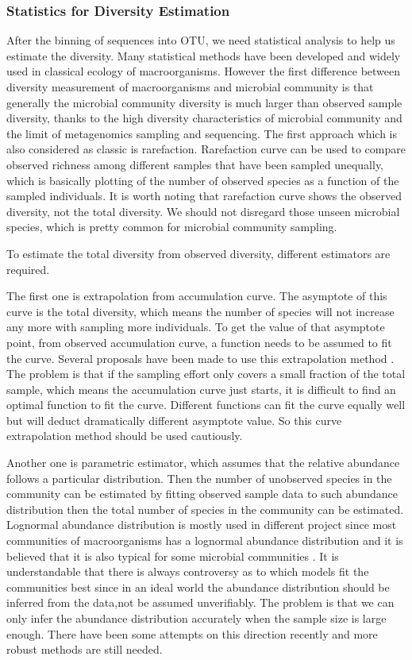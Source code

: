 \subsubsection{Statistics for Diversity Estimation} After the binning of
sequences into OTU, we need statistical analysis to help us estimate the diversity. Many
statistical methods have been developed and widely used in classical ecology of
macroorganisms. However the first difference between diversity measurement of
macroorganisms and microbial community is that generally the microbial
community diversity is much larger than observed sample diversity, thanks to
the high diversity characteristics of microbial community and the limit of
metagenomics sampling and sequencing. The first approach which is also
considered as classic is rarefaction. Rarefaction curve can be used to compare
observed richness among different samples that have been sampled unequally,
which is basically plotting of the number of observed species as a function of
the sampled individuals. It is worth noting that rarefaction curve shows the
observed diversity, not the total diversity. We should not disregard those
unseen microbial species, which is pretty common for microbial community
sampling.

To estimate the total diversity from observed diversity, different estimators
are required.

The first one is extrapolation from accumulation curve. The asymptote of this
curve is the total diversity, which means the number of species will not
increase any more with sampling more individuals. To get the value of that
asymptote point, from observed accumulation curve, a function needs to be
assumed to fit the curve. Several proposals have been made to use this
extrapolation method \cite{colwell2004interpolating, gotelli2001quantifying}.
The problem is that if the sampling effort only covers a small fraction of the
total sample, which means the accumulation curve just starts, it is difficult
to find an optimal function to fit the curve. Different functions can fit the
curve equally well but will deduct dramatically different asymptote value. So
this curve extrapolation method should be used cautiously.

Another one is parametric estimator, which assumes that the relative abundance
follows a particular distribution. Then the number of unobserved species in the
community can be estimated by fitting observed sample data to such abundance
distribution then the total number of species in the community can be
estimated. Lognormal abundance distribution is mostly used in different project
since most communities of macroorganisms has a lognormal abundance distribution
and it is believed that it is also typical for some microbial communities
\cite{Curtis:2002aa, Schloss:2006aa, Quince:2008aa}. It is understandable that
there is always controversy as to which models fit the communities best since
in an ideal world the abundance distribution should be inferred from the
data,not be assumed unverifiably. The problem is that we can only infer the
abundance distribution accurately when the sample size is large enough. There
have been some attempts on this direction recently \cite{Gans:2005aa} and more
robust methods are still needed.

